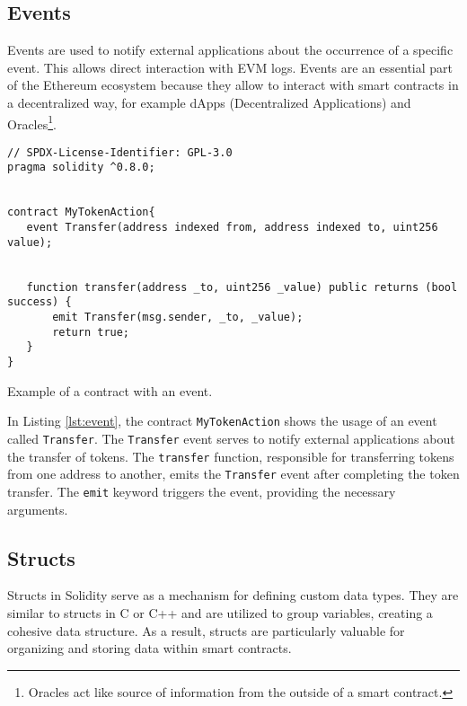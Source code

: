 \subsection{Events}

Events are used to notify external applications about the occurrence of a specific event. This allows direct interaction with EVM logs.
Events are an essential part of the Ethereum ecosystem because they allow to interact with smart contracts in a decentralized way, for example
dApps (Decentralized Applications) and Oracles\footnote{Oracles act like source of information from the outside of a smart contract.}.

\begin{listing}[!ht]
   \begin{verbatim}
// SPDX-License-Identifier: GPL-3.0
pragma solidity ^0.8.0;


contract MyTokenAction{
   event Transfer(address indexed from, address indexed to, uint256 value);


   function transfer(address _to, uint256 _value) public returns (bool success) {
       emit Transfer(msg.sender, _to, _value);
       return true;
   }
}
   \end{verbatim}
   \caption{Example of a contract with an event.}
   \label{lst:event}
\end{listing}


In Listing \ref{lst:event}, the contract \texttt{MyTokenAction} shows the usage of an event called \texttt{Transfer}. The \texttt{Transfer} event serves to notify external applications about the transfer of tokens. The \texttt{transfer} function, responsible for transferring tokens from one address to another, emits the
\texttt{Transfer} event after completing the token transfer. The \texttt{emit} keyword triggers the event, providing the necessary arguments.


\subsection{Structs}

Structs in Solidity serve as a mechanism for defining custom data types. They are similar to structs in C or C++ and are utilized to group variables, creating a cohesive 
data structure. As a result, structs are particularly valuable for organizing and storing data within smart contracts.


